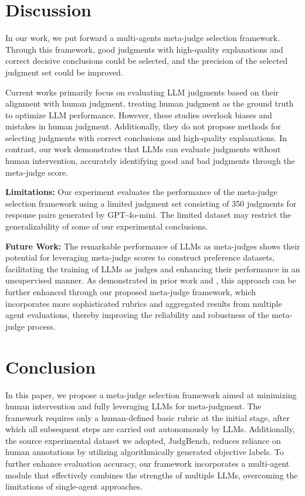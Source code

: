 \documentclass{article}
\theoremstyle{plain}
\theoremstyle{definition}
\theoremstyle{remark}
\begin{document}
\section{Discussion}
In our work, we put forward a multi-agents meta-judge selection framework. Through this framework, good judgments with high-quality explanations and correct decisive conclusions could be selected, and the precision of the selected judgment set could be improved.

Current works primarily focus on evaluating LLM judgments based on their alignment with human judgment, treating human judgment as the ground truth to optimize LLM performance. However, these studies overlook biases and mistakes in human judgment. Additionally, they do not propose methods for selecting judgments with correct conclusions and high-quality explanations. In contrast, our work demonstrates that LLMs can evaluate judgments without human intervention, accurately identifying good and bad judgments through the meta-judge score.

\textbf{Limitations:} Our experiment evaluates the performance of the meta-judge selection framework using a limited judgment set consisting of 350 judgments for response pairs generated by GPT-4o-mini. The limited dataset may restrict the generalizability of some of our experimental conclusions.

\textbf{Future Work:} The remarkable performance of LLMs as meta-judges shows their potential for leveraging meta-judge scores to construct preference datasets, facilitating the training of LLMs as judges and enhancing their performance in an unsupervised manner. As demonstrated in prior work \cite{14-wu2024meta} and \cite{trivedi2024self}, this approach can be further enhanced through our proposed meta-judge framework, which incorporates more sophisticated rubrics and aggregated results from multiple agent evaluations, thereby improving the reliability and robustness of the meta-judge process.

\section{Conclusion}
In this paper, we propose a meta-judge selection framework aimed at minimizing human intervention and fully leveraging LLMs for meta-judgment. The framework requires only a human-defined basic rubric at the initial stage, after which all subsequent steps are carried out autonomously by LLMs. Additionally, the source experimental dataset we adopted, JudgBench, reduces reliance on human annotations by utilizing algorithmically generated objective labels.
To further enhance evaluation accuracy, our framework incorporates a multi-agent module that effectively combines the strengths of multiple LLMs, overcoming the limitations of single-agent approaches. 
\end{document}
